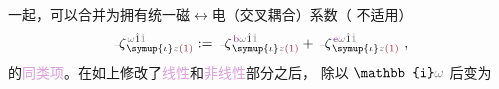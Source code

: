 一起，可以合并为拥有统一\textcolor{NavyBlue}{磁$\longleftrightarrow$电}（交叉耦合）系数\cite{welterTranslationallyInvariantSemiclassical2013}（ 不适用）
\begin{align} \label{eq:p<->m} %
	\Xint{\begin{smallmatrix} ~ \\ {}^{}_{\mathcolor{gray}{-}} \\ ~ \end{smallmatrix}}{12}{\zeta}^{\;\! \mathcolor{gray}{\omega} \hat{1} \mathcolor{gray}{\check{1}}}_{\;\! \symup{\iota} \mathcolor{gray}{z} \textcolor{Maroon}{(1)}} := \Xint{\begin{smallmatrix} ~ \\ {}^{}_{\mathcolor{gray}{-}} \\ ~ \end{smallmatrix}}{12}{\zeta}^{\;\! \textcolor{Plum}{\text{b}} \mathcolor{gray}{\omega} \hat{1} \mathcolor{gray}{\check{1}}}_{\;\! \symup{\iota} \mathcolor{gray}{z} \textcolor{Maroon}{(1)}} + \Xint{\begin{smallmatrix} ~ \\ {}^{}_{\mathcolor{gray}{-}} \\ ~ \end{smallmatrix}}{12}{\zeta}^{\;\! \textcolor{Plum}{\text{e}} \mathcolor{gray}{\omega} \hat{1} \mathcolor{gray}{\check{1}}}_{\;\! \symup{\iota} \mathcolor{gray}{z} \textcolor{Maroon}{(1)}} ~,
\end{align}
的\textcolor{Plum}{同类项}。在如上修改了\textcolor{Plum}{线性}和\textcolor{Plum}{非线性}部分之后， 除以 $\mathbb{i} \mathcolor{gray}{\omega}$ 后变为
